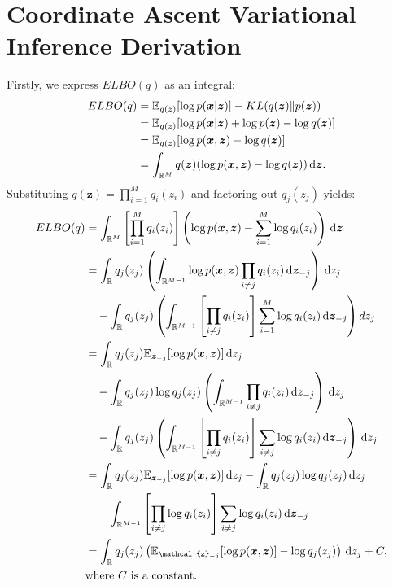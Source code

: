 \documentclass[honours,12pt, twoside]{unswthesis}
\newcommand{\R}{\mathbb{R}}
\numberwithin{equation}{section}
\theoremstyle{definition}
\begin{document}
\chapter{Coordinate Ascent Variational Inference Derivation}\label{app:mfvi}
Firstly, we express $ELBO(q)$ as an integral:
\begin{align*}
ELBO(q)&= \mathbb{E}_{q(z)}[\log p(\bm{x}|\bm{z})]-KL(q(\bm{z})\|p(\bm{z}))\\
&= \mathbb{E}_{q(z)}[\log p(\bm{x}|\bm{z})+\log p(\bm{z})-\log q(\bm{z})]\\
&= \mathbb{E}_{q(z)}[\log p(\bm{x}, \bm{z})-\log q(\bm{z})]\\
&= \int_{\R^M}q(\bm{z})(\log p(\bm{x},\bm{z})-\log q(\bm{z}))\, {\rm d}\bm{z}.
\end{align*}
Substituting $q(\bm{z})=\prod^M_{i=1}q_i(z_i)$ and factoring out $q_j(z_j)$ yields:
\begin{align}
ELBO(q)&= \int_{\R^M}\left[\prod^M_{i=1}q_i(z_i)\right]\left(\log p(\bm{x},\bm{z})-\sum_{i=1}^M\log q_i(z_i)\right)\, {\rm d}\bm{z}\nonumber\\
&= \int_{\R}q_j(z_j)\left(\int_{\R^{M-1}}\log p(\bm{x},\bm{z})\prod_{i\neq j}q_i(z_i)\, {\rm d}\bm{z}_{-j} \right) \, {\rm d}z_j\nonumber\\
&\quad -\int_{\R}q_j(z_j)\left(\int_{\R^{M-1}}\left[\prod_{i\neq j}q_i(z_i)\right]\sum_{i=1}^M \log q_i(z_i)\, {\rm d}\bm{z}_{-j}\right)dz_j\nonumber\\
&= \int_{\R}q_j(z_j)\mathbb{E}_{\bm{z}_{-j}}[\log p(\bm{x},\bm{z})]\, {\rm d}z_j\nonumber\\
&\quad -\int_{\R}q_j(z_j)\log q_j(z_j)\left(\int_{\R^{M-1}}\prod_{i\neq j}q_i(z_i)\, {\rm d}z_{-j}\right) \, {\rm d}z_j\nonumber\\
&\quad -\int_{\R}q_j(z_j)\left(\int_{\R^{M-1}}\left[\prod_{i\neq j}q_i(z_i)\right]\sum_{i\neq j}\log q_i(z_i)\, {\rm d}{\bm{z}_{-j}}\right)\, {\rm d}z_j\nonumber\\
&= \int_\R q_j(z_j)\mathbb{E}_{\bm{z}_{-j}}[\log p(\bm{x},\bm{z})]\, {\rm d}z_j-\int_\R q_j(z_j)\log q_j(z_j)\, {\rm d}z_j\nonumber\\
&\quad -\int_{\R^{M-1}}\left[\prod_{i\neq j}\log q_i(z_i)\right]\sum_{i\neq j}\log q_i(z_i)\, {\rm d}{\bm{z}_{-j}}\label{mfvi2}
\\&= \int_{\R}q_j(z_j)\left(\mathbb{E}_{\mathcal{z}_{-j}}[\log p(\bm{x},\bm{z})]-\log q_j(z_j)\right)\, {\rm d}z_j+C, \label{mfvi3}\\
&\text{where }C\text{ is a constant.}\nonumber
\end{align}
\end{document}
